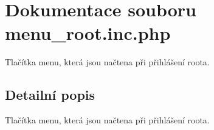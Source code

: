 \section{Dokumentace souboru menu\_\-root.inc.php}
\label{menu__root_8inc_8php}
Tlačítka menu, která jsou načtena při přihlášení roota. 



\subsection{Detailní popis}
Tlačítka menu, která jsou načtena při přihlášení roota. 

